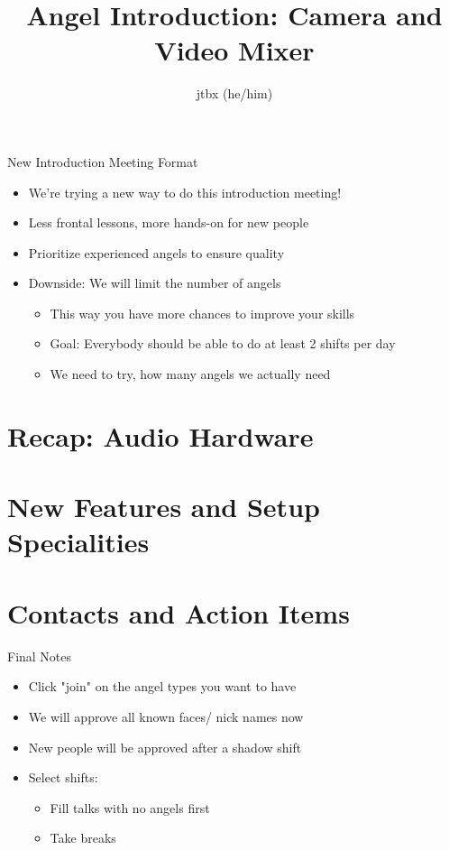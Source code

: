 \documentclass[aspectratio=169]{beamer}
\title{Angel Introduction: Camera and Video Mixer}
\author{jtbx (he/him)}
\institute{C3VOC
	\begin{flushright}
		\texttt{[image: images/link-repo-qr.png]}\\
		https://github.com/voc/engelschulung
	\end{flushright}
}
\begin{document}
\maketitle

\begin{frame}{New Introduction Meeting Format}
	\begin{itemize}
		\item We're trying a new way to do this introduction meeting!
		\item Less frontal lessons, more hands-on for new people
		\item Prioritize experienced angels to ensure quality
		\item Downside: We will limit the number of angels
		\begin{itemize}
			\item This way you have more chances to improve your skills
			\item Goal: Everybody should be able to do at least 2 shifts per day
			\item We need to try, how many angels we actually need
		\end{itemize}
	\end{itemize}
\end{frame}




\section{Recap: Audio Hardware}




\section{New Features and Setup Specialities}

%
%


\section{Contacts and Action Items}

%
%

\begin{frame}{Final Notes}
	\begin{itemize}
		\item Click "join" on the angel types you want to have
		\item We will approve all known faces/ nick names now
		\item New people will be approved after a shadow shift
		\item Select shifts:
		\begin{itemize}
			\item Fill talks with no angels first
			\item Take breaks
		\end{itemize}
	\end{itemize}
\end{frame}
\end{document}
